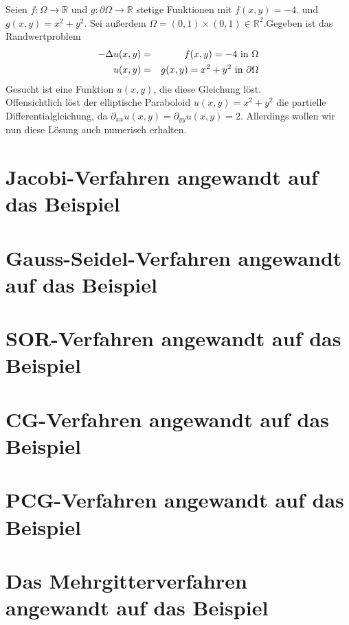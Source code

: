 Seien $f: \Omega \rightarrow \mathbb{R}$ und $g: \partial\Omega \rightarrow \mathbb{R}$ stetige Funktionen mit $f(x,y) = -4.$ und $g(x,y) = x^{2} + y^{2}$. Sei außerdem $\Omega = (0,1)\times(0,1) \in \mathbb{R}^{2}$.Gegeben ist das Randwertproblem
\begin{eqnarray}
	-\Delta u(x,y) &=& f(x,y) = -4 \textnormal{ in } \Omega \\
    u(x,y) &=& g(x,y) = x^{2} + y^{2} \textnormal{ in } \partial \Omega
\end{eqnarray}
Gesucht ist eine Funktion $u(x,y)$, die diese Gleichung löst. \\
Offensichtlich löst der elliptische Paraboloid $u(x,y) = x^{2} + y^{2}$ die partielle Differentialgleichung, da $\partial_{xx}u(x,y) = \partial_{yy}u(x,y) = 2$. Allerdings wollen wir nun diese Lösung auch numerisch erhalten.

\section{Jacobi-Verfahren angewandt auf das Beispiel}\label{s.Jacobi mit Beispiel}

\section{Gauss-Seidel-Verfahren angewandt auf das Beispiel}\label{s.Gauss-Seidel mit Beispiel}

\section{SOR-Verfahren angewandt auf das Beispiel}\label{s.SOR mit Beispiel}

\section{CG-Verfahren angewandt auf das Beispiel}\label{s.CG mit Beispiel}

\section{PCG-Verfahren angewandt auf das Beispiel}\label{s.PCG mit Beispiel}

\section{Das Mehrgitterverfahren angewandt auf das Beispiel}\label{s.Multigrid mit Beispiel}

